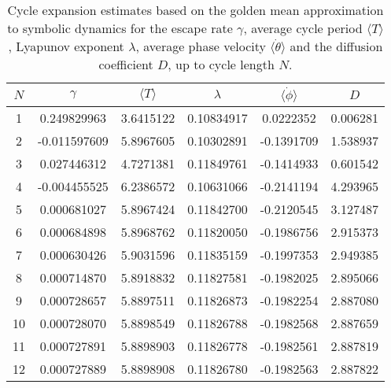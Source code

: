 \begin{table}
    \begin{tabular}{c|c|c|c|c|c}
     $N$ & $\gamma$ & $\langle T \rangle$ & $\lambda$ & $\langle \dot{\phi} \rangle$ & $D$ \\ 
    \hline
    1 & 0.249829963 & 3.6415122 & 0.10834917 & 0.0222352 & 0.006281 \\ 
    2 & -0.011597609 & 5.8967605 & 0.10302891 & -0.1391709 & 1.538937 \\ 
    3 & 0.027446312 & 4.7271381 & 0.11849761 & -0.1414933 & 0.601542 \\ 
    4 & -0.004455525 & 6.2386572 & 0.10631066 & -0.2141194 & 4.293965 \\ 
    5 & 0.000681027 & 5.8967424 & 0.11842700 & -0.2120545 & 3.127487 \\ 
    6 & 0.000684898 & 5.8968762 & 0.11820050 & -0.1986756 & 2.915373 \\ 
    7 & 0.000630426 & 5.9031596 & 0.11835159 & -0.1997353 & 2.949385 \\ 
    8 & 0.000714870 & 5.8918832 & 0.11827581 & -0.1982025 & 2.895066 \\ 
    9 & 0.000728657 & 5.8897511 & 0.11826873 & -0.1982254 & 2.887080 \\ 
    10 & 0.000728070 & 5.8898549 & 0.11826788 & -0.1982568 & 2.887659 \\ 
    11 & 0.000727891 & 5.8898903 & 0.11826778 & -0.1982561 & 2.887819 \\ 
    12 & 0.000727889 & 5.8898908 & 0.11826780 & -0.1982563 & 2.887822 \\ 
    \end{tabular}
    \caption{Cycle expansion estimates based on the golden mean approximation
              to symbolic dynamics for
             the escape rate $\gamma$, average cycle period $\langle T \rangle$,
             Lyapunov exponent $\lambda$, average phase velocity
             $\langle \dot{\theta} \rangle$ and the diffusion coefficient $D$,
             up to cycle length $N$.}
    \label{t-DynamicalAverages}
\end{table}
